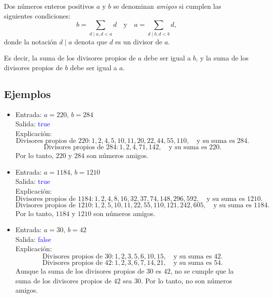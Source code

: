 Dos números enteros positivos \( a \) y \( b \) se denominan \textit{amigos} si cumplen las siguientes condiciones:
\[
b = \sum_{d \mid a, d < a}d \quad \text{y} \quad a = \sum_{d \mid b, d < b} d,
\]
donde la notación \( d \mid a \) denota que \( d \) es un divisor de \( a \). 

Es decir, la suma de los divisores propios de \( a \) debe ser igual a \( b \), y la suma de los divisores propios de \( b \) debe ser igual a \( a \).

\subsection*{Ejemplos}
\begin{itemize}
    \item Entrada: \( a = 220, \, b = 284 \)\\
    Salida: \textcolor{blue}{true}\\
    Explicación:
    \[
    \text{Divisores propios de } 220: 1, 2, 4, 5, 10, 11, 20, 22, 44, 55, 110, \quad \text{y su suma es } 284.
    \]
    \[
    \text{Divisores propios de } 284: 1, 2, 4, 71, 142, \quad \text{y su suma es } 220.
    \]
    Por lo tanto, \( 220 \) y \( 284 \) son números amigos.

    \item Entrada: \( a = 1184, \, b = 1210 \)\\
    Salida: \textcolor{blue}{true}\\
    Explicación:
    \[
    \text{Divisores propios de } 1184: 1, 2, 4, 8, 16, 32, 37, 74, 148, 296, 592, \quad \text{y su suma es } 1210.
    \]
    \[
    \text{Divisores propios de } 1210: 1, 2, 5, 10, 11, 22, 55, 110, 121, 242, 605, \quad \text{y su suma es } 1184.
    \]
    Por lo tanto, \( 1184 \) y \( 1210 \) son números amigos.

    \item Entrada: \( a = 30, \, b = 42 \)\\
    Salida: \textcolor{blue}{false}\\
    Explicación:
    \[
    \text{Divisores propios de } 30: 1, 2, 3, 5, 6, 10, 15, \quad \text{y su suma es } 42.
    \]
    \[
    \text{Divisores propios de } 42: 1, 2, 3, 6, 7, 14, 21, \quad \text{y su suma es } 54.
    \]
    Aunque la suma de los divisores propios de \( 30 \) es \( 42 \), no se cumple que la suma de los divisores propios de \( 42 \) sea \( 30 \). Por lo tanto, no son números amigos.
\end{itemize}
